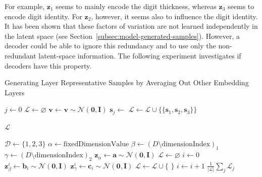 For example, $\bm{z}_1$ seems to mainly encode the digit thickness, whereas $\bm{z}_3$ seems to encode digit identity.
For $\bm{z}_2$, however, it seems also to influence the digit identity.
It has been shown that these factors of variation are not learned independently in the latent space (see Section~\ref{subsec:model-generated-samples}).
However, a decoder could be able to ignore this redundancy and to use only the non-redundant latent-space information.
The following experiment investigates if decoders have this property.
\begin{breakablealgorithm}
    \caption{Generating Layer Representative Samples by Averaging Out Other Embedding Layers}\label{alg:layer_representative_samples}
    \begin{algorithmic}[1]
            \State $j \gets 0$
            \State $\mathcal{L}\gets \varnothing$
                \State $\bm{v} \gets \bm{v} \sim \mathcal{N}(\bm{0}, \bm{I})$\label{line:fixing_v}
                    \State $\bm{s}_j \gets$ 
                \EndFor
                \State $\mathcal{L} \gets \mathcal{L} \cup \{\{\bm{s}_1, \bm{s}_2, \bm{s}_3\}\}$

            \EndWhile
            \State \Return $\mathcal{L}$
        \EndFunction

            \State $\mathcal{D} \gets \{1,2,3\}$
            \State $\alpha \gets \text{fixedDimensionValue}$
            \State $\beta \gets (D \setminus \text{dimensionIndex})_1$
            \State $\gamma \gets (D \setminus \text{dimensionIndex})_2$
            \State $\bm{z}_{\alpha} \gets \bm{a} \sim \mathcal{N}(\bm{0}, \bm{I})$
            \State $\mathcal{L}\gets \varnothing$
            \State $i \gets 0$
                \State $\bm{z}_{\beta}^i \gets \bm{b}_i \sim \mathcal{N}(\bm{0}, \bm{I})$
                \State $\bm{z}_{\gamma}^i \gets \bm{c}_i \sim \mathcal{N}(\bm{0}, \bm{I})$
                \State $\mathcal{L} \gets \mathcal{L} \cup \{$  $\}$
                \State $i \gets i + 1$
            \EndWhile
            \State \Return $\frac{1}{|\mathcal{L}|}\sum_j \mathcal{L}_j$
        \EndFunction
    \end{algorithmic}
\end{breakablealgorithm}

